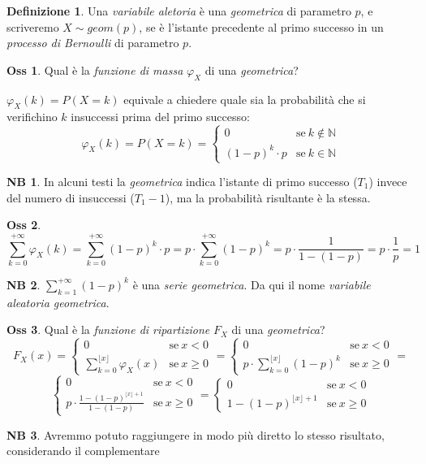 \documentclass[12pt, a4paper]{report}
\theoremstyle{definition}
\newtheorem{definition}{Definizione}[section]
\newtheorem*{observation}{Oss}
\newtheorem*{note}{NB}
\DeclareRobustCommand{\N}{\mathbb{N}}%
\begin{document}
\begin{definition}
	Una \emph{variabile aletoria} è una \emph{geometrica} di parametro $p$, e
	scriveremo \(X\sim geom(p)\), se è l'istante precedente al primo successo in
	un \emph{processo di Bernoulli} di parametro $p$.
\end{definition}

\begin{observation}
	Qual è la \emph{funzione di massa} $\varphi_X$ di una \emph{geometrica}?

	\(\varphi_X(k)=P(X=k)\) equivale a chiedere quale sia la probabilità che si
	verifichino $k$ insuccessi prima del primo successo:
	\[\varphi_X(k)=P(X=k)=\begin{cases}
		{0} & \text{se}\ {k\notin\N}\\
		{(1-p)^k\cdot p} & \text{se}\ {k\in\N}
	\end{cases}\]
\end{observation}
\begin{note}
	In alcuni testi la \emph{geometrica} indica l'istante di primo successo ($T_1$)
	invece del numero di insuccessi ($T_1-1$), ma la probabilità risultante è la
	stessa.
\end{note}
\begin{observation}
	\[\sum_{k=0}^{+\infty}\varphi_X(k)=\sum_{k=0}^{+\infty}(1-p)^k\cdot p=p\cdot \sum_{k=0}
	^{+\infty}(1-p)^k=p\cdot \frac{1}{1-(1-p)}=p\cdot \frac{1}{p}=1\]
	\begin{note}
		\(\sum_{k=1}^{+\infty}(1-p)^k\) è una \emph{serie geometrica}. Da qui il
		nome \emph{variabile aleatoria geometrica}.
	\end{note}
\end{observation}

\begin{observation}
	Qual è la \emph{funzione di ripartizione} $F_X$ di una \emph{geometrica}?
	\[F_X(x)=\begin{cases}
		{0} & \text{se}\ {x<0}\\
		{\sum_{k=0}^{\lfloor x\rfloor}\varphi_X(x)} & \text{se}\ {x\geq 0}
	\end{cases}=\begin{cases}
		{0} & \text{se}\ {x<0}\\
		{p\cdot \sum_{k=0}^{\lfloor x\rfloor}(1-p)^k} & \text{se}\ {x\geq 0}
	\end{cases}=\]
	\[\begin{cases}
		{0} & \text{se}\ {x<0}\\
		{p\cdot \frac{1-(1-p)^{\lfloor x\rfloor+1}}{1-(1-p)}} & \text{se}\ {x\geq 0}
	\end{cases}=\begin{cases}
		{0} & \text{se}\ {x<0}\\
		{1-(1-p)^{\lfloor x\rfloor+1}} & \text{se}\ {x\geq 0}
	\end{cases}\]
	\begin{note}
		Avremmo potuto raggiungere in modo più diretto lo stesso risultato,
		considerando il complementare 
	\end{note}
\end{observation}
\end{document}

